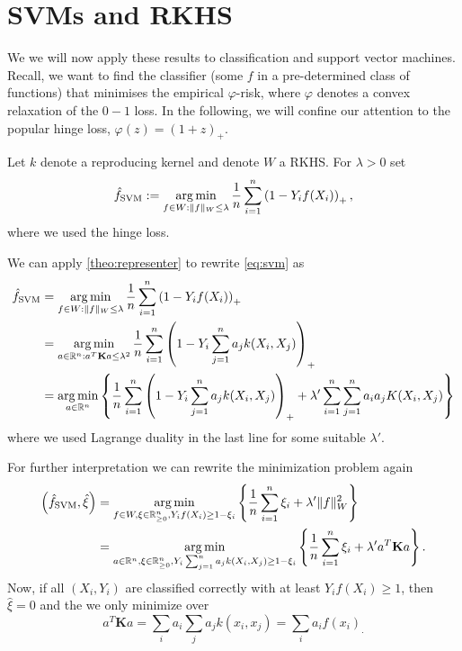 \section{SVMs and RKHS}

We we will now apply these results to classification and support vector machines. Recall, we want to find the classifier (some $f$ in a pre-determined class of functions) that minimises the empirical $\varphi$-risk, where $\varphi$ denotes a convex relaxation of the $0-1$ loss. In the following, we will confine our attention to the popular hinge loss, $\varphi(z) = (1 + z)_+$.

\begin{definition}
Let $k$ denote a reproducing kernel and denote $W$ a RKHS. For $\lambda > 0$ set 
\begin{equation}\label{eq:svm}
	\hat{f}_\mathrm{SVM} := \operatorname*{arg\,min}_{f \in W: \|f\|_W \leq \lambda} \frac{1}{n}\sum_{i = 1}^n \left(1 - Y_i f(X_i)\right)_+,
\end{equation}
where we used the hinge loss. 
\end{definition}

We can apply \autoref{theo:representer} to rewrite \eqref{eq:svm} as 
\begin{align*}
	\hat{f}_\mathrm{SVM} &= \operatorname*{arg\,min}_{f \in W: \|f\|_W \leq \lambda} \frac{1}{n}\sum_{i = 1}^n \left(1 - Y_i f(X_i)\right)_+ \\
											 &= \operatorname*{arg\,min}_{a \in \mathbb{R}^n: a^T\mathbf{K}a \leq \lambda^2} \frac{1}{n}\sum_{i = 1}^n \left(1 - Y_i \sum_{j=1}^n a_j k(X_i, X_j)\right)_+ \\
											 &= \operatorname*{arg\,min}_{a \in \mathbb{R}^n} \left\{\frac{1}{n}\sum_{i = 1}^n \left(1 - Y_i \sum_{j=1}^n a_j k(X_i, X_j)\right)_+ + \lambda' \sum_{i=1}^n\sum_{j=1}^n a_ia_j K(X_i, X_j) \right\} 
\end{align*}
where we used Lagrange duality in the last line for some suitable $\lambda'$.

For further interpretation we can rewrite the minimization problem again 
\begin{align*}
	\left(\hat{f}_\mathrm{SVM}, \hat{\xi} \right) &= \operatorname*{arg\,min}_{f \in W, \xi \in \mathbb{R}_{\geq 0}^n, Y_if(X_i) \geq 1 - \xi_i} \left\{\frac{1}{n}\sum_{i=1}^n \xi_i + \lambda'\|f\|_W^2\right\} \\
	&=\operatorname*{arg\,min}_{a\in\mathbb{R}^n, \xi \in \mathbb{R}_{\geq 0}^n, Y_i\sum_{j=1}^n a_j k(X_i, X_j) \geq 1 - \xi_i} \left\{\frac{1}{n}\sum_{i=1}^n \xi_i + \lambda'a^T\mathbf{K}a\right\}.
\end{align*}
Now, if all $(X_i, Y_i)$ are classified correctly with at least $Y_if(X_i) \geq 1$, then $\hat{\xi} = 0$ and the we only minimize over $$a^T\mathbf{K}a = \sum_ia_i \sum_j a_j k(x_i, x_j)=\sum_i a_i f(x_i)_.$$


